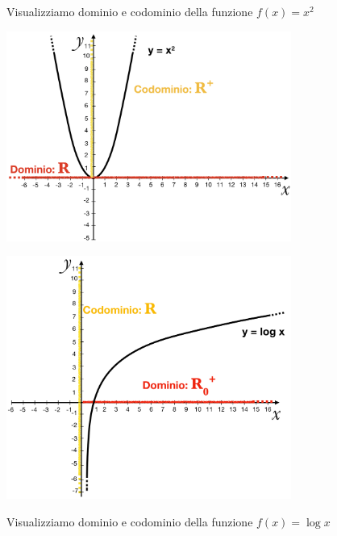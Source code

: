 \begin{minipage}{.49\textwidth}
\begin{esempio}
  Visualizziamo dominio e codominio della funzione \(f(x)=x^2\)
\end{esempio}
\end{minipage}
\begin{minipage}{.49\textwidth}
\begin{center}
\includegraphics[width=0.7\textwidth]{img/2a_funz.png}
\end{center}
\end{minipage}

\begin{minipage}{.49\textwidth}
\begin{center}
\includegraphics[width=0.7\textwidth]{img/2b_funz.png}
\end{center}
\end{minipage}
\begin{minipage}{.49\textwidth}
\begin{esempio}
  Visualizziamo dominio e codominio della funzione \(f(x)=\log{x}\)
\end{esempio}
\end{minipage}

